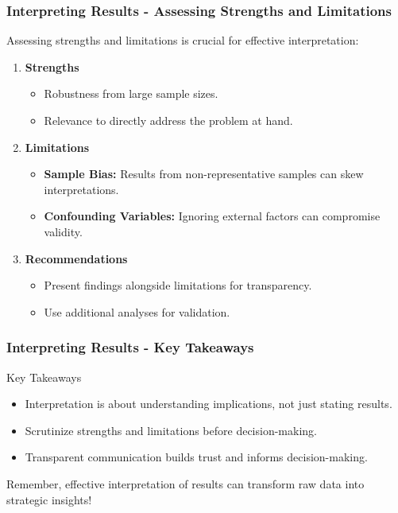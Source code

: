 \documentclass{beamer}
\begin{document}
\begin{frame}[fragile]
    \frametitle{Interpreting Results - Assessing Strengths and Limitations}
    Assessing strengths and limitations is crucial for effective interpretation:
    \begin{enumerate}
        \item \textbf{Strengths}
        \begin{itemize}
            \item Robustness from large sample sizes.
            \item Relevance to directly address the problem at hand.
        \end{itemize}
        
        \item \textbf{Limitations}
        \begin{itemize}
            \item \textbf{Sample Bias:} Results from non-representative samples can skew interpretations.
            \item \textbf{Confounding Variables:} Ignoring external factors can compromise validity.
        \end{itemize}
        
        \item \textbf{Recommendations}
        \begin{itemize}
            \item Present findings alongside limitations for transparency.
            \item Use additional analyses for validation.
        \end{itemize}
    \end{enumerate}
\end{frame}

\begin{frame}[fragile]
    \frametitle{Interpreting Results - Key Takeaways}
    \begin{block}{Key Takeaways}
        \begin{itemize}
            \item Interpretation is about understanding implications, not just stating results.
            \item Scrutinize strengths and limitations before decision-making.
            \item Transparent communication builds trust and informs decision-making.
        \end{itemize}
    \end{block}
    Remember, effective interpretation of results can transform raw data into strategic insights!
\end{frame}
\end{document}
